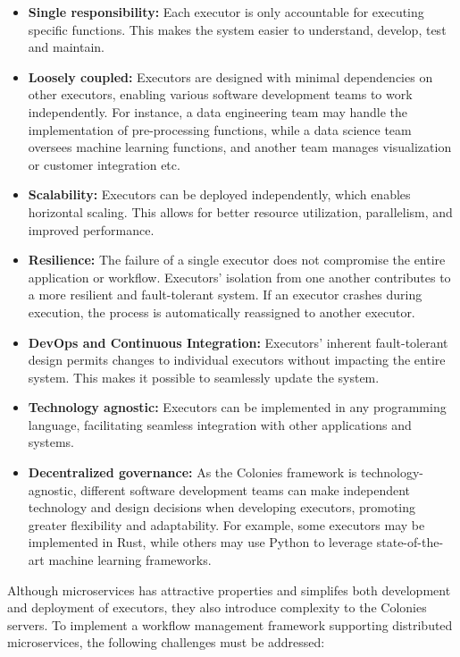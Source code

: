 \documentclass{article}
\begin{document}
\begin{itemize}
\item \textbf{Single responsibility:} Each executor is only accountable for executing specific functions. This makes the system easier to understand, develop, test and maintain.  
\item \textbf{Loosely coupled:} Executors are designed with minimal dependencies on other executors, enabling various software development teams to work independently. For instance, a data engineering team may handle the implementation of pre-processing functions, while a data science team oversees machine learning functions, and another team manages visualization or customer integration etc.
\item \textbf{Scalability:} Executors can be deployed independently, which enables horizontal scaling. This allows for better resource utilization, parallelism, and improved performance. 
\item \textbf{Resilience:} The failure of a single executor does not compromise the entire application or workflow. Executors' isolation from one another contributes to a more resilient and fault-tolerant system. If an executor crashes during execution, the process is automatically reassigned to another executor.
\item \textbf{DevOps and Continuous Integration:} Executors' inherent fault-tolerant design permits changes to individual executors without impacting the entire system. This makes it possible to seamlessly update the system. 
\item \textbf{Technology agnostic:} Executors can be implemented in any programming language, facilitating seamless integration with other applications and systems.
\item \textbf{Decentralized governance:} As the Colonies framework is technology-agnostic, different software development teams can make independent technology and design decisions when developing executors, promoting greater flexibility and adaptability. For example, some executors may be implemented in Rust, while others may use Python to leverage state-of-the-art machine learning frameworks.
\end{itemize}

Although microservices has attractive properties and simplifes both development and deployment of executors, they also introduce complexity to the Colonies servers. To implement a workflow management framework supporting distributed microservices, the following challenges must be addressed:
\end{document}

